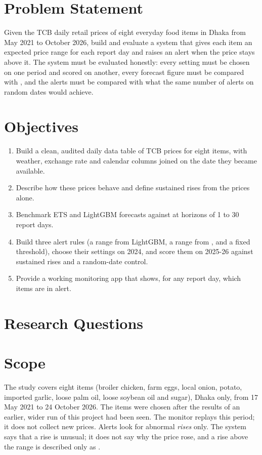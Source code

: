 \section{Problem Statement}
Given the TCB daily retail prices of eight everyday food items in Dhaka from May 2021 to October 2026, build and evaluate a system that gives each item an expected price range for each report day and raises an alert when the price stays above it. The system must be evaluated honestly: every setting must be chosen on one period and scored on another, every forecast figure must be compared with \naive{}, and the alerts must be compared with what the same number of alerts on random dates would achieve.

\section{Objectives}
\begin{enumerate}[leftmargin=*,itemsep=2pt]
\item Build a clean, audited daily data table of TCB prices for eight items, with weather, exchange rate and calendar columns joined on the date they became available.
\item Describe how these prices behave and define sustained rises from the prices alone.
\item Benchmark ETS and LightGBM forecasts against \naive{} at horizons of 1 to 30 report days.
\item Build three alert rules (a range from LightGBM, a range from \naive{}, and a fixed threshold), choose their settings on 2024, and score them on 2025-26 against sustained rises and a random-date control.
\item Provide a working monitoring app that shows, for any report day, which items are in alert.
\end{enumerate}

\section{Research Questions}
\begin{table}[H]\centering\small
\caption[Research questions]{Research questions.}\label{tab:rq}
\fittab{}
\end{table}

\section{Scope}
The study covers eight items (broiler chicken, farm eggs, local onion, potato, imported garlic, loose palm oil, loose soybean oil and sugar), Dhaka only, from 17 May 2021 to 24 October 2026. The items were chosen after the results of an earlier, wider run of this project had been seen. The monitor replays this period; it does not collect new prices. Alerts look for abnormal \emph{rises} only. The system says that a rise is unusual; it does not say why the price rose, and a rise above the range is described only as \unexpl{}.


